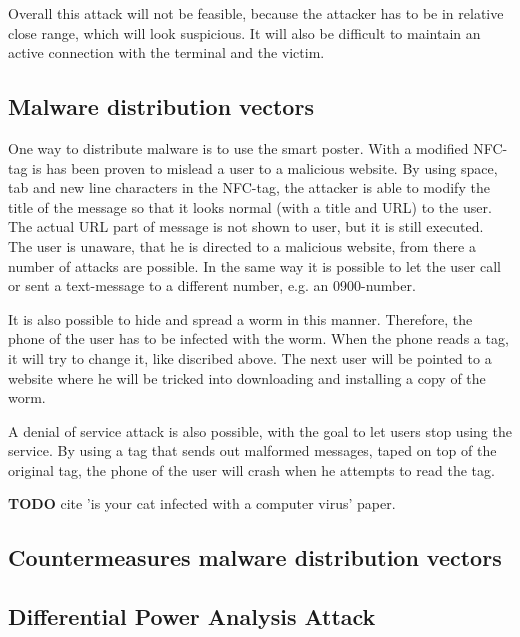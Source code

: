 Overall this attack will not be feasible, because the attacker has to be in relative close range, which will look suspicious. It will also be difficult to maintain an active connection with the terminal and the victim.




\subsection{Malware distribution vectors}
One way to distribute malware is to use the smart poster. With a modified NFC-tag is has been proven to mislead a user to a malicious website. By using space, tab and new line characters in the NFC-tag, the attacker is able to modify the title of the message so that it looks normal (with a title and URL) to the user. The actual URL part of message is not shown to user, but it is still executed. The user is unaware, that he is directed to a malicious website, from there a number of attacks are possible. In the same way it is possible to let the user call or sent a text-message to a different number, e.g. an 0900-number.

It is also possible to hide and spread a worm in this manner. Therefore, the phone of the user has to be infected with the worm. When the phone reads a tag, it will try to change it, like discribed above. The next user will be pointed to a website where he will be tricked into downloading and installing a copy of the worm.

A denial of service attack is also possible, with the goal to let users stop using the service. By using a tag that sends out malformed messages, taped on top of the original tag, the phone of the user will crash when he attempts to read the tag. \cite{10.1109/ARES.2009.46} 

\textbf{TODO} cite 'is your cat infected with a computer virus' paper.

\subsection{Countermeasures malware distribution vectors}


\subsection{Differential Power Analysis Attack}

